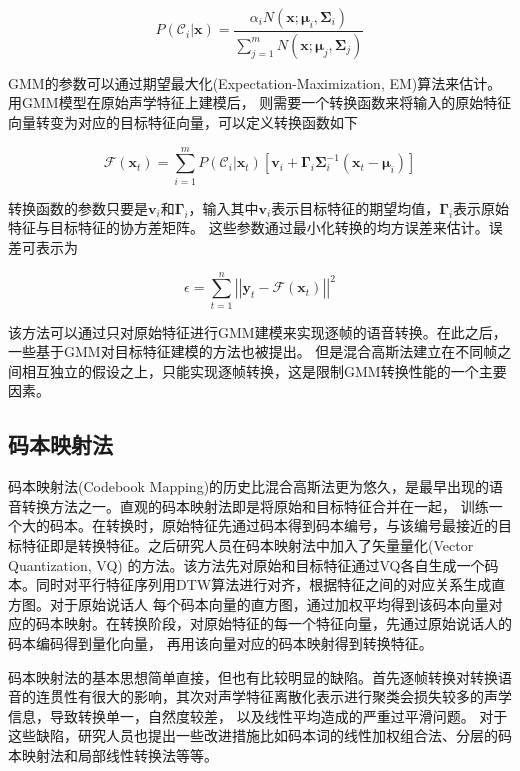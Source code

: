 \begin{equation}
    P(\mathcal{C}_i|\mathbf{x})=\frac{\alpha_iN(\mathbf{x};\bm{\mu}_i,\bm{\Sigma}_i)}{\sum^m_{j=1}N(\mathbf{x};\bm{\mu}_j,\bm{\Sigma}_j)}
\end{equation}

GMM的参数可以通过期望最大化(Expectation-Maximization, EM)算法来估计。用GMM模型在原始声学特征上建模后，
则需要一个转换函数来将输入的原始特征向量转变为对应的目标特征向量，可以定义转换函数如下

\begin{equation}
    \mathcal{F}(\mathbf{x}_t) = \sum^m_{i=1}P(\mathcal{C}_i|\mathbf{x}_t)\left[ \mathbf{v}_i + \bm{\Gamma}_i \bm{\Sigma}_i^{-1} (\mathbf{x}_t-\bm{\mu}_i) \right]
\end{equation}

转换函数的参数只要是$\mathbf{v}_i$和$\bm{\Gamma}_i$，输入其中$\mathbf{v}_i$表示目标特征的期望均值，$\bm{\Gamma}_i$表示原始特征与目标特征的协方差矩阵。
这些参数通过最小化转换的均方误差来估计。误差可表示为

\begin{equation}
    \epsilon = \sum^n_{t=1} \left| \left| \mathbf{y}_t - \mathcal{F}(\mathbf{x}_t) \right| \right|^2
\end{equation}

该方法可以通过只对原始特征进行GMM建模来实现逐帧的语音转换。在此之后，一些基于GMM对目标特征建模的方法也被提出\cite{kain1998spectral}。
但是混合高斯法建立在不同帧之间相互独立的假设之上，只能实现逐帧转换，这是限制GMM转换性能的一个主要因素。

\subsection{码本映射法}
码本映射法(Codebook Mapping)的历史比混合高斯法更为悠久，是最早出现的语音转换方法之一。直观的码本映射法即是将原始和目标特征合并在一起，
训练一个大的码本。在转换时，原始特征先通过码本得到码本编号，与该编号最接近的目标特征即是转换特征。之后研究人员在码本映射法中加入了矢量量化(Vector Quantization, VQ)
的方法。该方法先对原始和目标特征通过VQ各自生成一个码本。同时对平行特征序列用DTW算法进行对齐，根据特征之间的对应关系生成直方图。对于原始说话人
每个码本向量的直方图，通过加权平均得到该码本向量对应的码本映射。在转换阶段，对原始特征的每一个特征向量，先通过原始说话人的码本编码得到量化向量，
再用该向量对应的码本映射得到转换特征。

码本映射法的基本思想简单直接，但也有比较明显的缺陷。首先逐帧转换对转换语音的连贯性有很大的影响，其次对声学特征离散化表示进行聚类会损失较多的声学信息，导致转换单一，自然度较差，
以及线性平均造成的严重过平滑问题。
对于这些缺陷，研究人员也提出一些改进措施比如码本词的线性加权组合法、分层的码本映射法和局部线性转换法等等。

